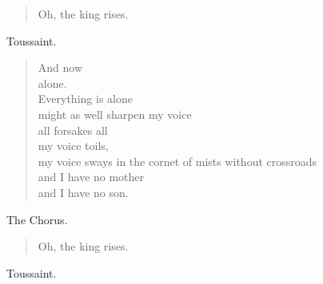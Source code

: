 \documentclass[letterpaper,article,12pt,oneside,notitlepage]{memoir}
\begin{document}
\begin{verse}
Oh, the king rises. \\
\end{verse}

\begin{center}Toussaint.\end{center}

\begin{verse}
And now \\
alone. \\
Everything is alone \\
might as well sharpen my voice \\
all forsakes all \\
my voice toils, \\
my voice sways in the cornet of mists without crossroads \\
and I have no mother \\
and I have no son. \\
\end{verse}

\begin{center}The Chorus.\end{center}

\begin{verse}
Oh, the king rises. \\
\end{verse}

\begin{center}Toussaint.\end{center}
\end{document}
